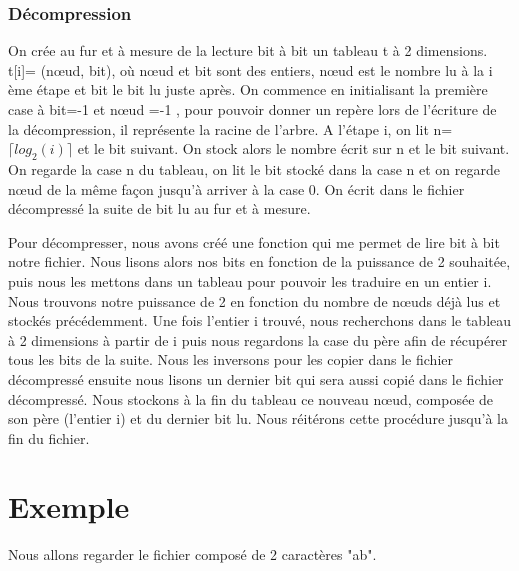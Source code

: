 \documentclass{report}
\begin{document}
\subsubsection{Décompression}
On crée au fur et à mesure de la lecture bit à bit un tableau t à 2 dimensions.  t[i]= (nœud, bit), où nœud et bit sont des entiers, nœud est le nombre lu à la i ème étape et bit le bit lu juste après. 
On commence en initialisant la première case à  bit=-1 et nœud =-1 , pour pouvoir donner un repère lors de l'écriture de la décompression, il représente la racine de l'arbre.  
A l'étape i, on lit n=$\lceil log_{2}(i) \rceil$ et le bit suivant. On stock alors le nombre écrit sur n et le bit suivant. On regarde la case n du tableau, on lit le bit stocké dans la case n et on regarde nœud de la même façon jusqu'à arriver à la case 0. On écrit dans le fichier décompressé la suite de bit lu au fur et à mesure.

Pour décompresser, nous avons créé une fonction qui me permet de lire bit à bit notre fichier. Nous lisons alors nos bits en fonction de la puissance de 2 souhaitée, puis nous les mettons dans un tableau pour pouvoir les traduire en un entier i. 
Nous trouvons notre puissance de 2 en fonction du nombre de nœuds déjà lus et stockés précédemment.
Une fois l'entier i  trouvé, nous recherchons dans le tableau à 2 dimensions à partir de i puis nous regardons la case du père afin de récupérer tous les bits de la suite. Nous les inversons pour les copier dans le fichier décompressé ensuite nous lisons un dernier bit qui sera aussi copié dans le fichier décompressé.
Nous stockons à la fin du tableau ce nouveau nœud, composée de son père (l'entier i) et du dernier bit lu. 
Nous réitérons cette procédure jusqu'à la fin du fichier. 

 
\section*{Exemple}
Nous allons regarder le fichier composé de 2 caractères "ab".
\end{document}
